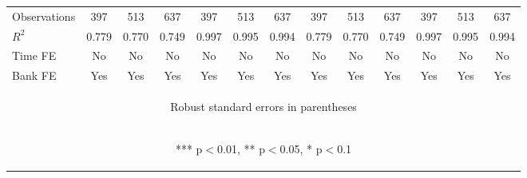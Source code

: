 \documentclass[]{article}
\begin{document}
\begin{center}
\begin{tabular}{lcccccccccccc}
Observations & 397 & 513 & 637 & 397 & 513 & 637 & 397 & 513 & 637 & 397 & 513 & 637 \\
$R^2$ & 0.779 & 0.770 & 0.749 & 0.997 & 0.995 & 0.994 & 0.779 & 0.770 & 0.749 & 0.997 & 0.995 & 0.994 \\
Time FE & No & No & No & No & No & No & No & No & No & No & No & No \\
 Bank FE & Yes & Yes & Yes & Yes & Yes & Yes & Yes & Yes & Yes & Yes & Yes & Yes \\ \hline
\multicolumn{13}{c}{\begin{footnotesize} Robust standard errors in parentheses\end{footnotesize}} \\
\multicolumn{13}{c}{\begin{footnotesize} *** p$<$0.01, ** p$<$0.05, * p$<$0.1\end{footnotesize}} \\
\end{tabular}
\end{center}
\end{document}
